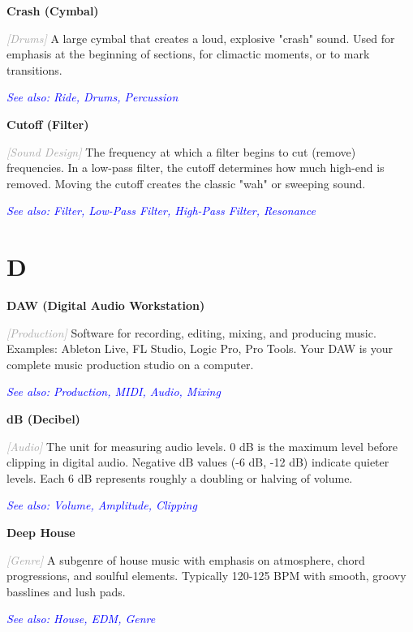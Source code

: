 \documentclass[11pt,letterpaper]{article}
\newcommand{\term}[1]{\textbf{\large\color{purple}#1}}
\newcommand{\category}[1]{\textcolor{darkgray}{\textit{\small [#1]}}}
\newcommand{\seealso}[1]{\textcolor{blue}{\textit{See also: #1}}}
\newenvironment{termdef}[1]
  {\noindent\term{#1}\par\nopagebreak}
  {\par\vspace{0.3em}}
\begin{document}
\begin{termdef}{Crash (Cymbal)}
\category{Drums}
A large cymbal that creates a loud, explosive "crash" sound. Used for emphasis at the beginning of sections, for climactic moments, or to mark transitions.

\seealso{Ride, Drums, Percussion}
\end{termdef}

\begin{termdef}{Cutoff (Filter)}
\category{Sound Design}
The frequency at which a filter begins to cut (remove) frequencies. In a low-pass filter, the cutoff determines how much high-end is removed. Moving the cutoff creates the classic "wah" or sweeping sound.

\seealso{Filter, Low-Pass Filter, High-Pass Filter, Resonance}
\end{termdef}

\newpage


\section*{D}

\begin{termdef}{DAW (Digital Audio Workstation)}
\category{Production}
Software for recording, editing, mixing, and producing music. Examples: Ableton Live, FL Studio, Logic Pro, Pro Tools. Your DAW is your complete music production studio on a computer.

\seealso{Production, MIDI, Audio, Mixing}
\end{termdef}

\begin{termdef}{dB (Decibel)}
\category{Audio}
The unit for measuring audio levels. 0 dB is the maximum level before clipping in digital audio. Negative dB values (-6 dB, -12 dB) indicate quieter levels. Each 6 dB represents roughly a doubling or halving of volume.

\seealso{Volume, Amplitude, Clipping}
\end{termdef}

\begin{termdef}{Deep House}
\category{Genre}
A subgenre of house music with emphasis on atmosphere, chord progressions, and soulful elements. Typically 120-125 BPM with smooth, groovy basslines and lush pads.

\seealso{House, EDM, Genre}
\end{termdef}
\end{document}

